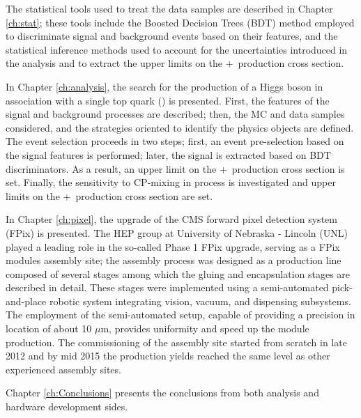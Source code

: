 The statistical tools used to treat the data samples are described in Chapter \ref{ch:stat}; these tools include the Boosted Decision Trees (BDT) method employed to discriminate signal and background events based on their features, and the statistical inference methods used to account for the uncertainties introduced in the analysis and to extract the upper limits on the \tH+\ttH\ production cross section. 


In Chapter \ref{ch:analysis}, the search for the production of a Higgs boson in association with a single top quark (\tH) is presented. First, the features of the signal and background processes are described; then, the MC and data samples considered, and the strategies oriented to identify the physics objects are defined. The event selection proceeds in two steps; first, an event pre-selection based on the signal features is performed; later, the signal is extracted based on BDT discriminators. As a result, an upper limit on the \tH+\ttH\ production cross section is set. Finally, the  sensitivity to CP-mixing in \tH process is investigated and upper limits on the \tH+\ttH\ production cross section are set.   

In Chapter \ref{ch:pixel}, the upgrade of the CMS forward pixel detection system (FPix) is presented. The HEP group at University of Nebraska - Lincoln (UNL) played a leading role in the so-called Phase 1 FPix upgrade, serving as a FPix modules assembly site; the assembly process was designed as a production line composed of several stages among which the gluing and encapsulation stages are described in detail. These stages were implemented using a semi-automated pick-and-place robotic system integrating vision, vacuum, and dispensing subsystems. The employment of the semi-automated setup, capable of providing a precision in location of about 10 $\mu$m, provides uniformity and speed up the module production. The commissioning of the assembly site started from scratch in late 2012 and by mid 2015 the production yields reached the same level as other experienced assembly sites.

Chapter \ref{ch:Conclusions} presents the conclusions from both analysis and hardware development sides.


